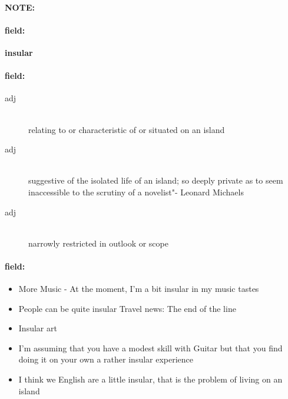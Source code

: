 \documentclass[12pt]{article}
\newenvironment{note}{\paragraph{NOTE:}}{}
\newenvironment{field}{\paragraph{field:}}{}
\begin{document}
\begin{note}
\begin{field}
\textbf{\large insular}
\end{field}


\begin{field}
\begin{description}
\item[adj] \hfill \\ 
relating to or characteristic of or situated on an island

\item[adj] \hfill \\ 
suggestive of the isolated life of an island; so deeply private as to seem inaccessible to the scrutiny of a novelist"- Leonard Michaels

\item[adj] \hfill \\ 
narrowly restricted in outlook or scope

\end{description}
\end{field}

\begin{field}
\begin{itemize}
\item More Music - At the moment, I'm a bit insular in my music tastes
\item People can be quite insular Travel news: The end of the line
\item Insular art
\item I'm assuming that you have a modest skill with Guitar but that you find doing it on your own a rather insular experience
\item I think we English are a little insular, that is the problem of living on an island
\end{itemize}
\end{field}
\end{note}
\end{document}
